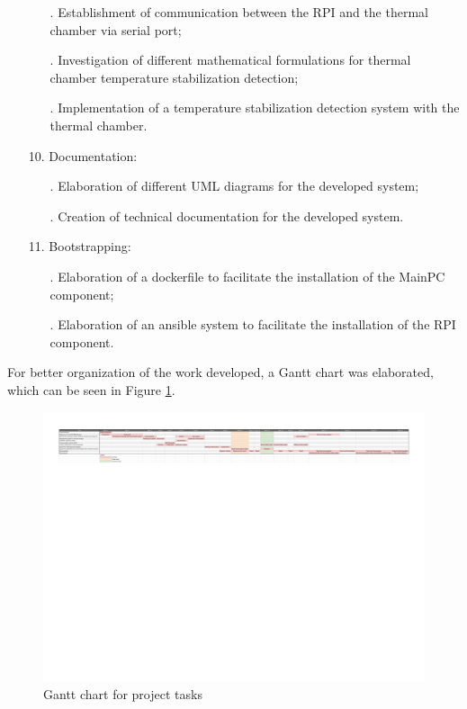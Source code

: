 \begin{itemize}
\begin{itemize}
            \item[.] Establishment of communication between the RPI and the thermal chamber via serial port;
            \item[.] Investigation of different mathematical formulations for thermal chamber temperature stabilization detection;
            \item[.] Implementation of a temperature stabilization detection system with the thermal chamber.
        \end{itemize}
    \item[] 10. Documentation:
        \begin{itemize}
            \item[.] Elaboration of different UML diagrams for the developed system;
            \item[.] Creation of technical documentation for the developed system.
        \end{itemize}
    \item[] 11. Bootstrapping:
        \begin{itemize}
            \item[.] Elaboration of a dockerfile to facilitate the installation of the MainPC component;
            \item[.] Elaboration of an ansible system to facilitate the installation of the RPI component.
        \end{itemize}
\end{itemize}

For better organization of the work developed, a Gantt chart was elaborated, which can be seen in Figure \ref{fig:gantt_chart}.

\begin{figure}[H]
    \centering
    \includegraphics[width=\textwidth, clip, trim=0 24cm 0 0]{figures/ganttchart.pdf}
    \caption{Gantt chart for project tasks}
    \label{fig:gantt_chart}
\end{figure}
